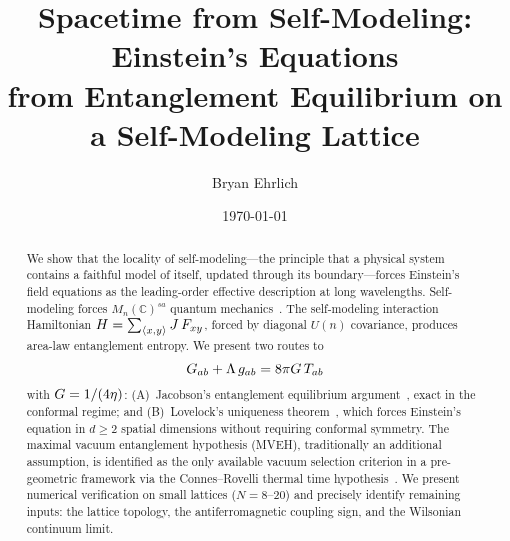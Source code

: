 \documentclass[aps,prd,twocolumn,superscriptaddress,nofootinbib]{revtex4-2}
\begin{document}
\title{Spacetime from Self-Modeling: Einstein's Equations\\from Entanglement Equilibrium on a Self-Modeling Lattice}

\author{Bryan Ehrlich}

\date{\today}

\begin{abstract}
We show that the locality of self-modeling---the principle that a physical
system contains a faithful model of itself, updated through its
boundary---forces Einstein's field equations as the leading-order effective
description at long wavelengths. Self-modeling forces
$M_n(\mathbb{C})^{sa}$ quantum mechanics~\cite{Paper5}. The self-modeling
interaction Hamiltonian $H = \sum_{\langle x,y\rangle} J\, F_{xy}$,
forced by diagonal $U(n)$ covariance, produces area-law entanglement
entropy. We present two routes to
\begin{equation*}
  G_{ab} + \Lambda\, g_{ab} = 8\pi G\, T_{ab}
\end{equation*}
with $G = 1/(4\eta)$: (A)~Jacobson's entanglement equilibrium
argument~\cite{Jacobson2016}, exact in the conformal regime; and
(B)~Lovelock's uniqueness theorem~\cite{Lovelock1971}, which forces
Einstein's equation in $d \geq 2$ spatial dimensions without requiring
conformal symmetry. The maximal vacuum entanglement hypothesis (MVEH),
traditionally an additional assumption, is identified as the only available
vacuum selection criterion in a pre-geometric framework via the
Connes--Rovelli thermal time hypothesis~\cite{ConnesRovelli1994}.
We present numerical verification on small lattices ($N = 8$--$20$) and
precisely identify remaining inputs: the lattice topology, the
antiferromagnetic coupling sign, and the Wilsonian continuum limit.
\end{abstract}

\maketitle









\begin{acknowledgments}
\end{acknowledgments}


\end{document}
